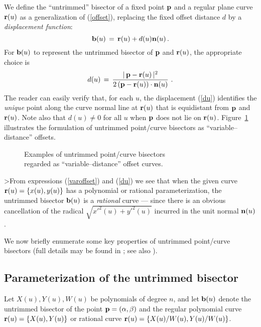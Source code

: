 We define the ``untrimmed'' bisector of a fixed point ${\bf p}$
and a regular plane curve ${\bf r}(u)$ as a generalization of
(\ref{offset}), replacing the fixed offset distance $d$ by a
{\it displacement function\/}:
\begin{equation} \label{varoffset}
{\bf b}(u) \,=\, {\bf r}(u) + d(u) {\bf n}(u) \,.
\end{equation}
For ${\bf b}(u)$ to represent the untrimmed bisector of ${\bf p}$
and ${\bf r}(u)$, the appropriate choice is
\begin{equation} \label{du}
d(u) \,=\, {|\,{\bf p}-{\bf r}(u)\,|^2 \over
2\,({\bf p}-{\bf r}(u))\cdot{\bf n}(u)} \,\,.
\end{equation}
The reader can easily verify that, for each $u$, the displacement
(\ref{du}) identifies the {\it unique\/} point along the curve normal
line at ${\bf r}(u)$ that is equidistant from ${\bf p}$ and ${\bf r}
(u)$. Note also that $d(u)\not=0$ for all $u$ when ${\bf p}$ does not
lie on ${\bf r}(u)$.
Figure~\ref{fig:varoffset} illustrates the formulation of untrimmed
point/curve bisectors as ``variable--distance'' offsets.

\begin{figure}[htbp] \vspace{3in}
\caption[]{Examples of untrimmed point/curve bisectors \\
regarded as ``variable--distance'' offset curves. }
\label{fig:varoffset} \end{figure}

\begin{rmk} {\rm
>From expressions (\ref{varoffset}) and (\ref{du}) we see
that when the given curve ${\bf r}(u)=\{x(u),y(u)\}$ has a
polynomial or rational parameterization, the untrimmed bisector
${\bf b}(u)$ is a {\it rational\/} curve --- since there is an
obvious cancellation of the radical $\sqrt{{x'}^2(u)+{y'}^2(u)}$
incurred in the unit normal ${\bf n}(u)$. }
\end{rmk}

We now briefly enumerate some key properties of untrimmed
point/curve bisectors (full details may be found in \cite
{farouki91b}; see also \cite{field92}).

\subsection{Parameterization of the untrimmed bisector}

Let $X(u),Y(u),W(u)$ be polynomials of degree $n$, and let
${\bf b}(u)$ denote the untrimmed bisector of the point ${\bf p}
=(\alpha,\beta)$ and the regular polynomial curve ${\bf r}(u)=
\{X(u),Y(u)\}$ or rational curve ${\bf r}(u)=\{X(u)/W(u),
Y(u)/W(u)\}$.

